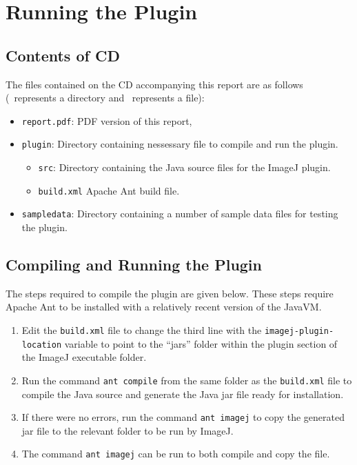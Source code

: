 
\chapter{Running the Plugin}
\label{cha:running_the_plugin}

\section{Contents of CD}
\label{sec:contents_of_cd}

The files contained on the CD accompanying this report are as follows
(\folder~represents a directory and \file~represents a file):
\begin{itemize}
	\item[\file] \texttt{report.pdf}: PDF version of this report,
	\item[\folder] \texttt{plugin}: Directory containing nessessary file to
		compile and run the plugin.
		\begin{itemize}
			\item[\folder] \texttt{src}: Directory containing the Java source
				files for the ImageJ plugin.
			\item[\file] \texttt{build.xml} Apache Ant build file.
		\end{itemize}
	\item[\folder] \texttt{sampledata}: Directory containing a number of sample
		data files for testing the plugin.
\end{itemize}

\section{Compiling and Running the Plugin}
\label{sec:running_the_plugin}

The steps required to compile the plugin are given below. These steps require
Apache Ant to be installed with a relatively recent version of the JavaVM\@.
\begin{enumerate}
	\item Edit the \texttt{build.xml} file to change the third line with the
		\texttt{imagej-plugin-location} variable to point to the ``jars''
		folder within the plugin section of the ImageJ executable folder.
	\item Run the command \texttt{ant compile} from the same folder as the
		\texttt{build.xml} file to compile the Java source and generate the
		Java jar file ready for installation.
	\item If there were no errors, run the command \texttt{ant imagej} to copy
		the generated jar file to the relevant folder to be run by ImageJ.
	\item The command \texttt{ant imagej} can be run to both compile and copy
		the file.
\end{enumerate}

